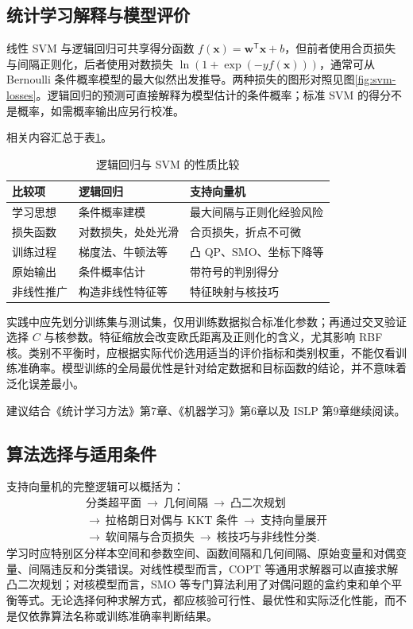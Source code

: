 \subsection{统计学习解释与模型评价}

线性 SVM 与逻辑回归可共享得分函数 $f(\boldsymbol x)=\boldsymbol w^{\mathsf T}\boldsymbol x+b$，但前者使用合页损失与间隔正则化，后者使用对数损失 $\ln(1+\exp(-yf(\boldsymbol x)))$，通常可从 Bernoulli 条件概率模型的最大似然出发推导。两种损失的图形对照见图\ref{fig:svm-losses}。逻辑回归的预测可直接解释为模型估计的条件概率；标准 SVM 的得分不是概率，如需概率输出应另行校准。

相关内容汇总于表\ref{tab:logistic-svm}。
\begin{table}[htbp]\centering
\caption{逻辑回归与 SVM 的性质比较}\label{tab:logistic-svm}
\begin{tabularx}{\textwidth}{lXX}\toprule
比较项&逻辑回归&支持向量机\\\midrule
学习思想&条件概率建模&最大间隔与正则化经验风险\\
损失函数&对数损失，处处光滑&合页损失，折点不可微\\
训练过程&梯度法、牛顿法等&凸 QP、SMO、坐标下降等\\
原始输出&条件概率估计&带符号的判别得分\\
非线性推广&构造非线性特征等&特征映射与核技巧\\
\bottomrule
\end{tabularx}
\end{table}

实践中应先划分训练集与测试集，仅用训练数据拟合标准化参数；再通过交叉验证选择 $C$ 与核参数。特征缩放会改变欧氏距离及正则化的含义，尤其影响 RBF 核。类别不平衡时，应根据实际代价选用适当的评价指标和类别权重，不能仅看训练准确率。模型训练的全局最优性是针对给定数据和目标函数的结论，并不意味着泛化误差最小。

建议结合《统计学习方法》第7章、《机器学习》第6章以及 ISLP 第9章继续阅读\cite{lihang2019,zhou2016,james2023}。

\subsection{算法选择与适用条件}

支持向量机的完整逻辑可以概括为：
\[
\begin{gathered}
\text{分类超平面}\ \longrightarrow\ \text{几何间隔}\ \longrightarrow\ \text{凸二次规划}\\
\longrightarrow\ \text{拉格朗日对偶与 KKT 条件}\ \longrightarrow\ \text{支持向量展开}\\
\longrightarrow\ \text{软间隔与合页损失}\ \longrightarrow\ \text{核技巧与非线性分类}.
\end{gathered}
\]
学习时应特别区分样本空间和参数空间、函数间隔和几何间隔、原始变量和对偶变量、间隔违反和分类错误。对线性模型而言，COPT 等通用求解器可以直接求解凸二次规划；对核模型而言，SMO 等专门算法利用了对偶问题的盒约束和单个平衡等式。无论选择何种求解方式，都应核验可行性、最优性和实际泛化性能，而不是仅依靠算法名称或训练准确率判断结果。
